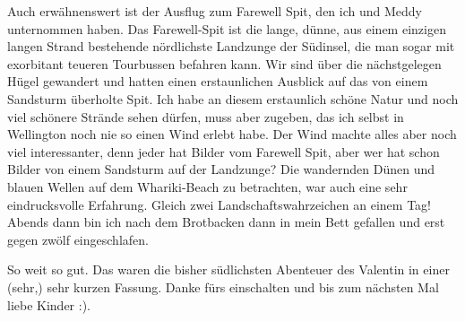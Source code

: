 Auch erwähnenswert ist der Ausflug zum Farewell Spit, den ich und Meddy
unternommen haben. Das Farewell-Spit ist die lange, dünne, aus einem
einzigen langen Strand bestehende nördlichste Landzunge der Südinsel,
die man sogar mit exorbitant teueren Tourbussen befahren kann. Wir sind
über die nächstgelegen Hügel gewandert und hatten einen erstaunlichen
Ausblick auf das von einem Sandsturm überholte Spit. Ich habe an diesem
erstaunlich schöne Natur und noch viel schönere Strände sehen dürfen,
muss aber zugeben, das ich selbst in Wellington noch nie so einen Wind
erlebt habe. Der Wind machte alles aber noch viel interessanter, denn
jeder hat Bilder vom Farewell Spit, aber wer hat schon Bilder von einem
Sandsturm auf der Landzunge? Die wandernden Dünen und blauen Wellen auf
dem Whariki-Beach zu betrachten, war auch eine sehr eindrucksvolle
Erfahrung. Gleich zwei Landschaftswahrzeichen an einem Tag! Abends dann
bin ich nach dem Brotbacken dann in mein Bett gefallen und erst gegen
zwölf eingeschlafen.

So weit so gut. Das waren die bisher südlichsten Abenteuer des Valentin
in einer (sehr,) sehr kurzen Fassung. Danke fürs einschalten und bis zum
nächsten Mal liebe Kinder :).
